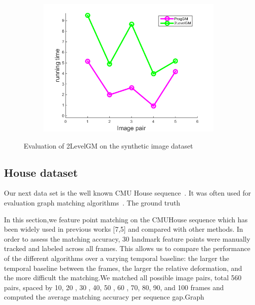 \begin{figure}[h]
\begin{subfigure}[b]{0.33\textwidth}
		\end{subfigure}
		\begin{subfigure}[b]{0.32\textwidth}
			\centering
			\includegraphics[scale=0.35]{"chapter3/fig/ImageTrafo/anchor_descr/using_cpd_afftrafo/performance/time1"}
		\end{subfigure} 	
	\caption[Evaluation of 2LevelGM on the synthetic image dataset]{Evaluation of 2LevelGM on the synthetic image dataset} \label{fig:ImageTrafo}
\end{figure}

\subsection{House dataset}
Our next data set is the well known CMU House sequence~\cite{CMUHouse}. It was often used for evaluation graph matching algorithms~\cite{Armiti2014,Hancock_ModalClusters,Cho2010_RRWM,Duchenne2011,FastPFP,Hancock_EM_SVD}. The ground truth~\cite{CMUHouse_GT}

In this section,we  feature point matching on the CMUHouse sequence which has been widely used in previous works [7,5] and compared with other methods. In order to assess the matching accuracy, 30 landmark feature points were manually tracked and labeled across all frames. This allows us to compare the performance of the different algorithms over a varying temporal baseline: the larger the temporal baseline between the frames, the larger the relative deformation, and the more difficult the matching.We matched all possible image pairs, total 560 pairs, spaced by 10, 20 , 30 , 40, 50 , 60 , 70, 80, 90, and 100 frames and computed the average matching accuracy per sequence gap.Graph

